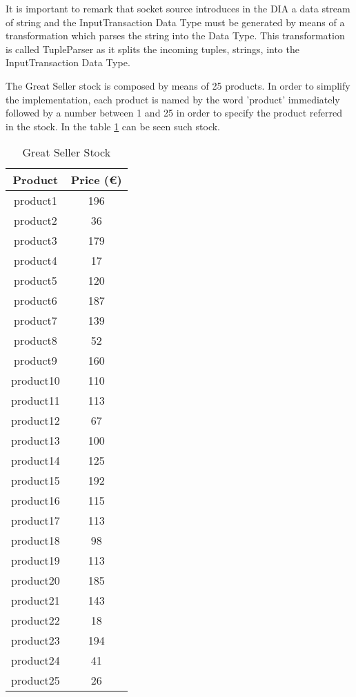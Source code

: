 It is important to remark that socket source introduces in the DIA a data stream of string and the InputTransaction Data Type must be generated by means of a transformation which parses the string into the Data Type. This transformation is called TupleParser as it splits the incoming tuples, strings, into the InputTransaction Data Type.

The Great Seller stock is composed by means of 25 products. In order to simplify the implementation, each product is named by the word 'product' immediately followed by a number between 1 and 25 in order to specify the product referred in the stock. In the table \ref{Great Seller Stock} can be seen such stock.

\begin{table}[h!]
\centering
	\begin{tabular}{||c|c||} 
	\hline\hline
	Product & Price (\euro{}) \\ [1ex] 
	\hline\hline
	product1 & 196 \\ 
	\hline
	product2 & 36 \\ 
	\hline
	product3 & 179 \\ 
	\hline
	product4 & 17 \\ 
	\hline
	product5 & 120 \\ 
	\hline
	product6 & 187 \\ 
	\hline
	product7 & 139 \\ 
	\hline
	product8 & 52 \\ 
	\hline
	product9 & 160 \\ 
	\hline
	product10 & 110 \\ 
	\hline
	product11 & 113 \\ 
	\hline
	product12 & 67 \\ 
	\hline
	product13 & 100 \\ 
	\hline
	product14 & 125 \\ 
	\hline
	product15 & 192 \\ 
	\hline
	product16 & 115 \\ 
	\hline
	product17 & 113 \\ 
	\hline
	product18 & 98 \\ 
	\hline
	product19 & 113 \\ 
	\hline
	product20 & 185 \\ 
	\hline
	product21 & 143 \\ 
	\hline
	product22 & 18 \\ 
	\hline
	product23 & 194 \\ 
	\hline
	product24 & 41 \\ 
	\hline
	product25 & 26 \\ 
	\hline\hline
	\end{tabular}
\caption{Great Seller Stock}
\label{Great Seller Stock}
\end{table}

